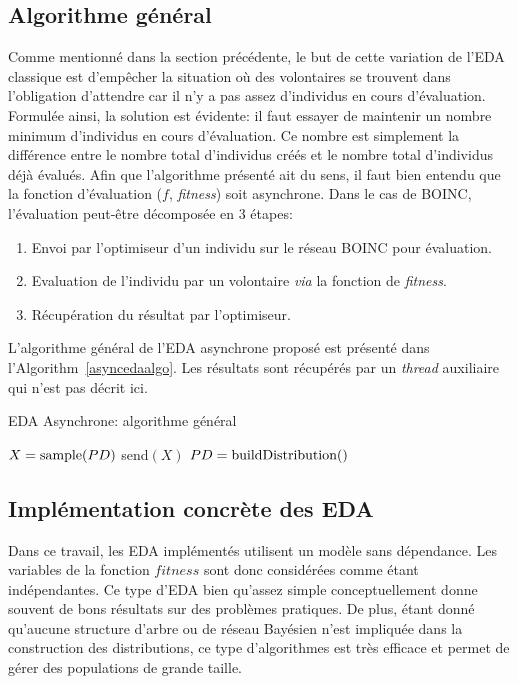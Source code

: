 \documentclass[a4paper, 12pt]{report}
\begin{document}
\subsection{Algorithme général}
Comme mentionné dans la section précédente, le but de cette variation de l'EDA classique est d'empêcher la situation où des volontaires se trouvent dans l'obligation d'attendre car il n'y a pas assez d'individus en cours d'évaluation. Formulée ainsi, la solution est évidente: il faut essayer de maintenir un nombre minimum d'individus en cours d'évaluation. Ce nombre est simplement la différence entre le nombre total d'individus créés et le nombre total d'individus déjà évalués. 
\newpage
Afin que l'algorithme présenté ait du sens, il faut bien entendu que la fonction d'évaluation ($f$, \textit{fitness}) soit asynchrone. Dans le cas de \textsc{BOINC}, l'évaluation peut-être décomposée en 3 étapes:
\begin{enumerate}[1)]
\item Envoi par l'optimiseur d'un individu sur le réseau \textsc{BOINC} pour évaluation.
\item Evaluation de l'individu par un volontaire \textit{via} la fonction de \textit{fitness}.
\item Récupération du résultat par l'optimiseur.
\end{enumerate}

L'algorithme général de l'EDA asynchrone proposé est présenté dans l'Algorithm~\ref{asyncedaalgo}. Les résultats sont récupérés par un \textit{thread} auxiliaire qui n'est pas décrit ici. 

\begin{algorithm}[!tb]                      
\caption{EDA Asynchrone: algorithme général}          
\label{asyncedaalgo}                           
\begin{algorithmic}   
\STATE $X = \textnormal{sample}(PD)$
\STATE send$(X)$
\ENDIF
{}
\STATE $PD = \textnormal{buildDistribution}()$
\ENDIF
\ENDWHILE
             
\end{algorithmic}
\end{algorithm}


\subsection{Implémentation concrète des EDA}
Dans ce travail, les EDA implémentés utilisent un modèle sans dépendance. Les variables de la fonction $fitness$ sont donc considérées comme étant indépendantes. Ce type d'EDA bien qu'assez simple conceptuellement donne souvent de bons résultats sur des problèmes pratiques. De plus, étant donné qu'aucune structure d'arbre ou de réseau Bayésien n'est impliquée dans la construction des distributions, ce type d'algorithmes est très efficace et permet de gérer des populations de grande taille.
\end{document}
